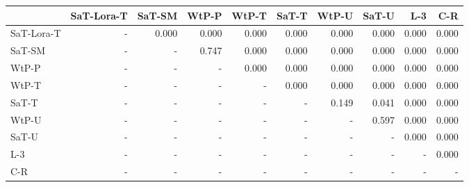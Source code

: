 \begin{tabular}{lrrrrrrrrr}
\toprule
 & SaT-Lora-T & SaT-SM & WtP-P & WtP-T & SaT-T & WtP-U & SaT-U & L-3 & C-R \\
\midrule
SaT-Lora-T & - & 0.000 & 0.000 & 0.000 & 0.000 & 0.000 & 0.000 & 0.000 & 0.000 \\
SaT-SM & - & - & 0.747 & 0.000 & 0.000 & 0.000 & 0.000 & 0.000 & 0.000 \\
WtP-P & - & - & - & 0.000 & 0.000 & 0.000 & 0.000 & 0.000 & 0.000 \\
WtP-T & - & - & - & - & 0.000 & 0.000 & 0.000 & 0.000 & 0.000 \\
SaT-T & - & - & - & - & - & 0.149 & 0.041 & 0.000 & 0.000 \\
WtP-U & - & - & - & - & - & - & 0.597 & 0.000 & 0.000 \\
SaT-U & - & - & - & - & - & - & - & 0.000 & 0.000 \\
L-3 & - & - & - & - & - & - & - & - & 0.000 \\
C-R & - & - & - & - & - & - & - & - & - \\
\bottomrule
\end{tabular}


